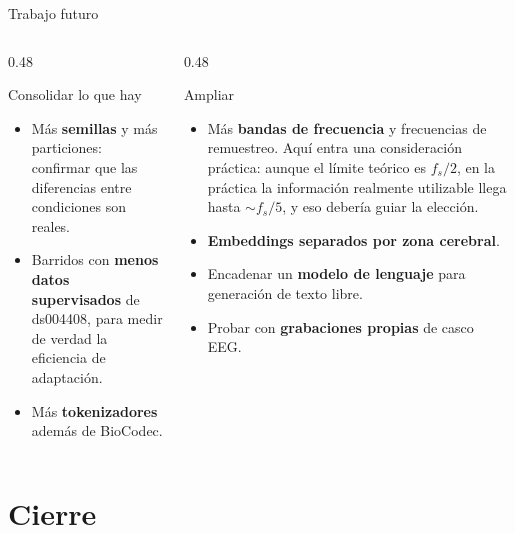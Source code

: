 \documentclass[aspectratio=169,10pt]{beamer}
\newcommand{\term}[1]{\textbf{\color{deepgreen}#1}}
\begin{document}
\begin{frame}[c]{Trabajo futuro}
  \small
  \begin{columns}[t,totalwidth=\linewidth]
    \begin{column}{0.48\linewidth}
      \begin{block}{Consolidar lo que hay}
        \begin{itemize}\footnotesize
          \item Más \term{semillas} y más particiones: confirmar que las diferencias entre condiciones son reales.
          \item Barridos con \term{menos datos supervisados} de ds004408, para medir de verdad la eficiencia de adaptación.
          \item Más \term{tokenizadores} además de BioCodec.
        \end{itemize}
      \end{block}
    \end{column}
    \begin{column}{0.48\linewidth}
      \begin{block}{Ampliar}
        \begin{itemize}\footnotesize
          \item Más \term{bandas de frecuencia} y frecuencias de remuestreo. Aquí entra una consideración práctica: aunque el límite teórico es $f_s/2$, en la práctica la información realmente utilizable llega hasta $\sim f_s/5$, y eso debería guiar la elección.
          \item \term{Embeddings separados por zona cerebral}.
          \item Encadenar un \term{modelo de lenguaje} para generación de texto libre.
          \item Probar con \term{grabaciones propias} de casco EEG.
        \end{itemize}
      \end{block}
    \end{column}
  \end{columns}
\end{frame}

\section{Cierre}
\end{document}
